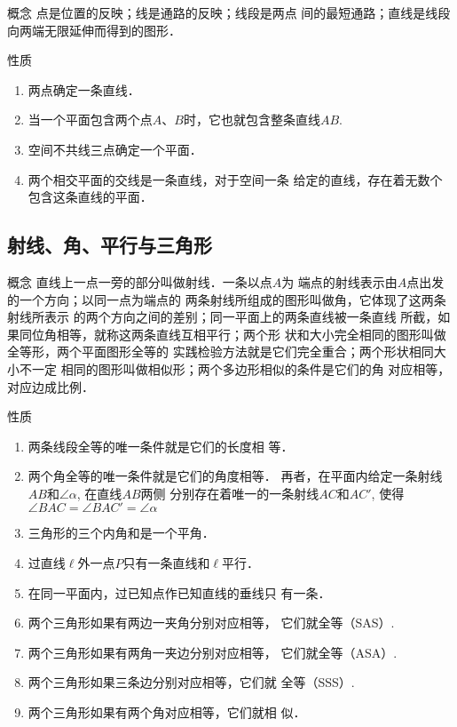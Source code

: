 \begin{blk}
	{概念} 点是位置的反映；线是通路的反映；线段是两点
间的最短通路；直线是线段向两端无限延伸而得到的图形．
\end{blk}

\begin{blk}
	{性质}
\begin{enumerate}
	\item 两点确定一条直线．
	\item 当一个平面包含两个点$A$、$B$时，它也就包含整条直线$AB$.
	\item 空间不共线三点确定一个平面．
	\item 两个相交平面的交线是一条直线，对于空间一条
	给定的直线，存在着无数个包含这条直线的平面．
\end{enumerate}
\end{blk}

\subsection*{射线、角、平行与三角形}

\begin{blk}
	{概念} 直线上一点一旁的部分叫做射线．一条以点$A$为
端点的射线表示由$A$点出发的一个方向；以同一点为端点的
两条射线所组成的图形叫做角，它体现了这两条射线所表示
的两个方向之间的差别；同一平面上的两条直线被一条直线
所截，如果同位角相等，就称这两条直线互相平行；两个形
状和大小完全相同的图形叫做全等形，两个平面图形全等的
实践检验方法就是它们完全重合；两个形状相同大小不一定
相同的图形叫做相似形；两个多边形相似的条件是它们的角
对应相等，对应边成比例．
\end{blk}

\begin{blk}{性质}
\begin{enumerate}
	\item 两条线段全等的唯一条件就是它们的长度相
	等．
	\item 两个角全等的唯一条件就是它们的角度相等．
	再者，在平面内给定一条射线$AB$和$\angle \alpha$, 在直线$AB$两侧
	分别存在着唯一的一条射线$AC$和$AC'$, 使得$\angle BAC=
	\angle BAC'=\angle\alpha$
	\item 三角形的三个内角和是一个平角．
	\item 过直线$\ell$外一点$P$只有一条直线和$\ell$平行．
	\item 在同一平面内，过已知点作已知直线的垂线只
	有一条．
	\item 两个三角形如果有两边一夹角分别对应相等，
	它们就全等（SAS）.
	\item 两个三角形如果有两角一夹边分别对应相等，
	它们就全等（ASA）.
	\item 两个三角形如果三条边分别对应相等，它们就
	全等（SSS）.
	\item 两个三角形如果有两个角对应相等，它们就相
	似．
	\end{enumerate}
\end{blk}

